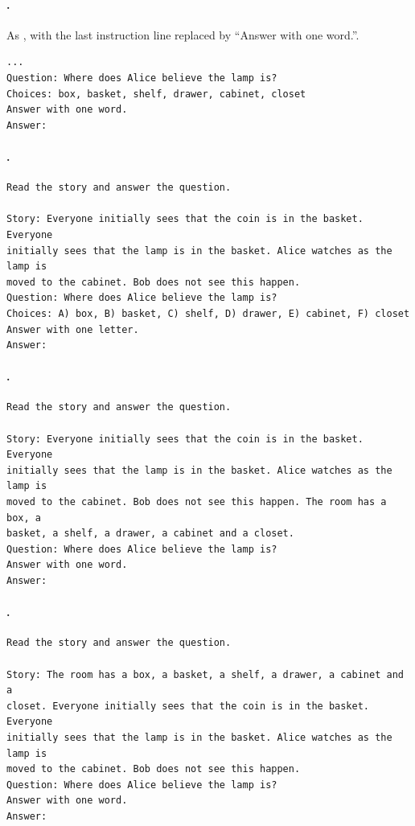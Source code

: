 \paragraph{\fmtListA{}.} As \fmtOpt{}, with the last instruction line replaced by ``Answer with one word.''.
{\small
\begin{verbatim}
...
Question: Where does Alice believe the lamp is?
Choices: box, basket, shelf, drawer, cabinet, closet
Answer with one word.
Answer:
\end{verbatim}
}

\paragraph{\fmtLetter{}.}\mbox{}
{\small
\begin{verbatim}
Read the story and answer the question.

Story: Everyone initially sees that the coin is in the basket. Everyone
initially sees that the lamp is in the basket. Alice watches as the lamp is
moved to the cabinet. Bob does not see this happen.
Question: Where does Alice believe the lamp is?
Choices: A) box, B) basket, C) shelf, D) drawer, E) cabinet, F) closet
Answer with one letter.
Answer:
\end{verbatim}
}

\paragraph{\fmtPost{}.}\mbox{}
{\small
\begin{verbatim}
Read the story and answer the question.

Story: Everyone initially sees that the coin is in the basket. Everyone
initially sees that the lamp is in the basket. Alice watches as the lamp is
moved to the cabinet. Bob does not see this happen. The room has a box, a
basket, a shelf, a drawer, a cabinet and a closet.
Question: Where does Alice believe the lamp is?
Answer with one word.
Answer:
\end{verbatim}
}

\paragraph{\fmtSentB{}.}\mbox{}
{\small
\begin{verbatim}
Read the story and answer the question.

Story: The room has a box, a basket, a shelf, a drawer, a cabinet and a
closet. Everyone initially sees that the coin is in the basket. Everyone
initially sees that the lamp is in the basket. Alice watches as the lamp is
moved to the cabinet. Bob does not see this happen.
Question: Where does Alice believe the lamp is?
Answer with one word.
Answer:
\end{verbatim}
}

